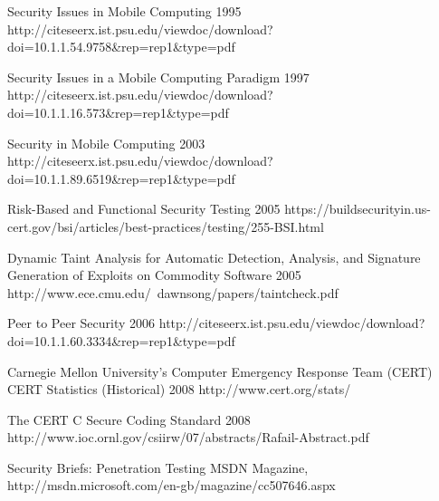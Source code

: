 \begin{thebibliography}{9}

		{}
		{Security Issues in Mobile Computing}	
		{1995}	
		{http://citeseerx.ist.psu.edu/viewdoc/download?doi=10.1.1.54.9758\&rep=rep1\&type=pdf}
		
		{
			\BibAnd
			}
		{Security Issues in a Mobile Computing Paradigm}	
		{1997}	
		{http://citeseerx.ist.psu.edu/viewdoc/download?doi=10.1.1.16.573\&rep=rep1\&type=pdf}
	
		{
			\BibAnd
			\BibAnd
			\BibAnd
			}
		{Security in Mobile Computing}	
		{2003}	
		{http://citeseerx.ist.psu.edu/viewdoc/download?doi=10.1.1.89.6519\&rep=rep1\&type=pdf}

		{
			\BibAnd
			}
		{Risk-Based and Functional Security Testing}	
		{2005}	
		{https://buildsecurityin.us-cert.gov/bsi/articles/best-practices/testing/255-BSI.html}

		{
			\BibAnd
			}
		{Dynamic Taint Analysis for Automatic Detection, Analysis, and Signature Generation of Exploits on Commodity Software}	
		{2005}	
		{http://www.ece.cmu.edu/~dawnsong/papers/taintcheck.pdf}
	
		{}
		{Peer to Peer Security}	
		{2006}
		{http://citeseerx.ist.psu.edu/viewdoc/download?doi=10.1.1.60.3334\&rep=rep1\&type=pdf}


		{Carnegie Mellon University's Computer Emergency Response Team (CERT)}
		{CERT Statistics (Historical)}
		{2008}
		{http://www.cert.org/stats/}
				
		{
			\BibAnd
			}
		{The {CERT} {C} Secure Coding Standard}
		{2008}
		{http://www.ioc.ornl.gov/csiirw/07/abstracts/Rafail-Abstract.pdf}

		{}
		{Security Briefs: Penetration Testing}
		{MSDN Magazine, }
		{http://msdn.microsoft.com/en-gb/magazine/cc507646.aspx}


\end{thebibliography}
